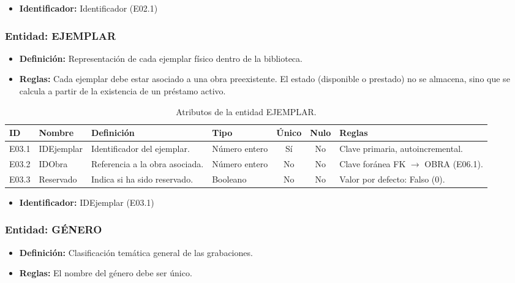 	\begin{itemize}
		\item\textbf{Identificador:} Identificador (E02.1)
	\end{itemize}
	
	\subsubsection{Entidad: EJEMPLAR}
	\begin{itemize}
		\item\textbf{Definición:} Representación de cada ejemplar físico dentro de la biblioteca.
		\item\textbf{Reglas:} Cada ejemplar debe estar asociado a una obra preexistente. El estado (disponible o prestado) no se almacena, sino que se calcula a partir de la existencia de un préstamo activo.
	\end{itemize}
	
	\begin{table}[H]
		\centering
		\caption{Atributos de la entidad EJEMPLAR.}
		\label{tab:dict_ejemplar}
		\small
		\begin{tabularx}{\textwidth}{l l X l c c X}
			\toprule
			\textbf{ID} & \textbf{Nombre} & \textbf{Definición} & \textbf{Tipo} & \textbf{Único} & \textbf{Nulo} & \textbf{Reglas} \\
			\midrule
			E03.1 & IDEjemplar & Identificador del ejemplar. & Número entero & Sí & No & Clave primaria, autoincremental. \\
			\addlinespace
			E03.2 & IDObra & Referencia a la obra asociada. & Número entero & No & No & Clave foránea FK $\rightarrow$ OBRA (E06.1). \\
			\addlinespace
			E03.3 & Reservado & Indica si ha sido reservado. & Booleano & No & No & Valor por defecto: Falso (0). \\
			\bottomrule
		\end{tabularx}
	\end{table}
	
	\begin{itemize}
		\item\textbf{Identificador:} IDEjemplar (E03.1)
	\end{itemize}
	
	\subsubsection{Entidad: GÉNERO}
	\begin{itemize}
		\item\textbf{Definición:} Clasificación temática general de las grabaciones.
		\item\textbf{Reglas:} El nombre del género debe ser único.
	\end{itemize}
	
